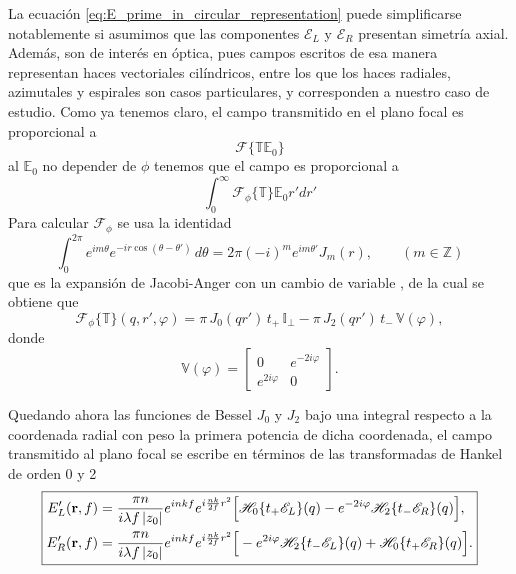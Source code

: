 La ecuación \eqref{eq:E_prime_in_circular_representation} puede simplificarse notablemente si asumimos que las componentes $\mathscr E_L$ y $\mathscr E_R$ presentan simetría axial. Además, son de interés en óptica, pues campos escritos de esa manera representan haces vectoriales cilíndricos, entre los que los haces radiales, azimutales y espirales son casos particulares, y corresponden a nuestro caso de estudio. Como ya tenemos claro, el campo transmitido en el plano focal es proporcional a
\begin{equation}
  \mathscr F \{ \mathbb T \mathbb E_0 \}
\end{equation}
al $\mathbb E_0$ no depender de $\phi$ tenemos que el campo es proporcional a
\begin{equation}
  \int_0^{\infty} \mathscr F_\phi \{ \mathbb T\} \mathbb E_0 r'dr'
\end{equation}
Para calcular $\mathscr{F}_\phi$ se usa la identidad
\begin{equation}
\int_0^{2\pi} e^{im\theta}e^{-ir\cos(\theta - \theta')}\,d\theta
=
2\pi(-i)^m e^{im\theta'} J_m(r),
\qquad (m\in\mathbb Z)
\end{equation}
que es la expansión de Jacobi-Anger con un cambio de variable \cite{Watson1944}, de la cual se obtiene que
\begin{equation}
  \mathscr{F}_\phi\{\mathbb{T}\}(q, r', \varphi)
  =
  \pi\,J_0(qr')\,t_+\,\mathbb{I}_\perp
  -
  \pi\,J_2(qr')\,t_-\,\mathbb{V}(\varphi),
  \label{eq:Fphi_M_circular}
\end{equation}
donde
\begin{equation}
\mathbb V(\varphi)
=
\begin{bmatrix}
0 & e^{-2i\varphi}
\\
e^{2i\varphi} & 0
\end{bmatrix}.
\label{eq:def_V_mixing}
\end{equation}

Quedando ahora las funciones de Bessel $J_0$ y $J_2$ bajo una integral respecto a la coordenada radial con peso la primera potencia de dicha coordenada, el campo transmitido al plano focal se escribe en términos de las transformadas de Hankel de orden 0 y 2
\begin{equation}
\boxed{
\begin{aligned}
E'_L(\vb r,f)
&=
\frac{\pi n}{i\lambda f\,|z_0|}
e^{inkf}
e^{i\frac{nk}{2f}r^2}
\Big[
\mathscr H_0\{t_+\mathscr E_L\}(q)
-
e^{-2i\varphi}
\mathscr H_2\{t_-\mathscr E_R\}(q)
\Big],
\\
E'_R(\vb r,f)
&=
\frac{\pi n}{i\lambda f\,|z_0|}
e^{inkf}
e^{i\frac{nk}{2f}r^2}
\Big[
-e^{2i\varphi} \mathscr H_2\{t_-\mathscr E_L\}(q)
+
\mathscr H_0\{t_+\mathscr E_R\}(q)
\Big].
\end{aligned}
\label{eq:E_L_E_R_Hankel}
}
\end{equation}

